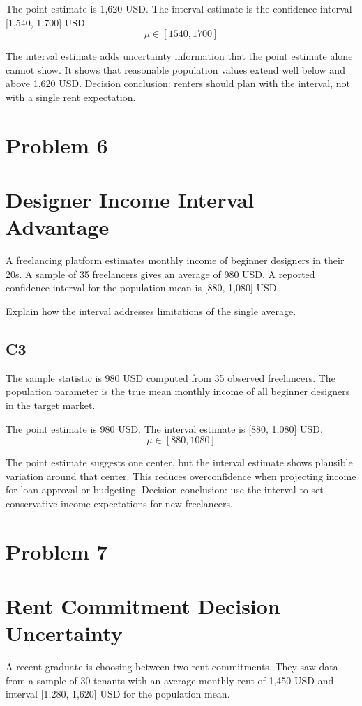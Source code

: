 \begin{ExamProblems}
		The point estimate is 1,620 USD.
		The interval estimate is the confidence interval [1,540, 1,700] USD.
		\[
		\mu \in [1540,1700]
		\]

		The interval estimate adds uncertainty information that the point estimate alone cannot show.
		It shows that reasonable population values extend well below and above 1,620 USD.
		Decision conclusion: renters should plan with the interval, not with a single rent expectation.

		\newpage
		\item
		\section{Problem 6}
		\section{Designer Income Interval Advantage}
		A freelancing platform estimates monthly income of beginner designers in their 20s.
		A sample of 35 freelancers gives an average of 980 USD.
		A reported confidence interval for the population mean is [880, 1,080] USD.

		Explain how the interval addresses limitations of the single average.

		\subsection*{C3}
		The sample statistic is 980 USD computed from 35 observed freelancers.
		The population parameter is the true mean monthly income of all beginner designers in the target market.

		The point estimate is 980 USD.
		The interval estimate is [880, 1,080] USD.
		\[
		\mu \in [880,1080]
		\]

		The point estimate suggests one center, but the interval estimate shows plausible variation around that center.
		This reduces overconfidence when projecting income for loan approval or budgeting.
		Decision conclusion: use the interval to set conservative income expectations for new freelancers.

		\newpage
		\item
		\section{Problem 7}
		\section{Rent Commitment Decision Uncertainty}
		A recent graduate is choosing between two rent commitments.
		They saw data from a sample of 30 tenants with an average monthly rent of 1,450 USD and interval [1,280, 1,620] USD for the population mean.


\end{ExamProblems}
